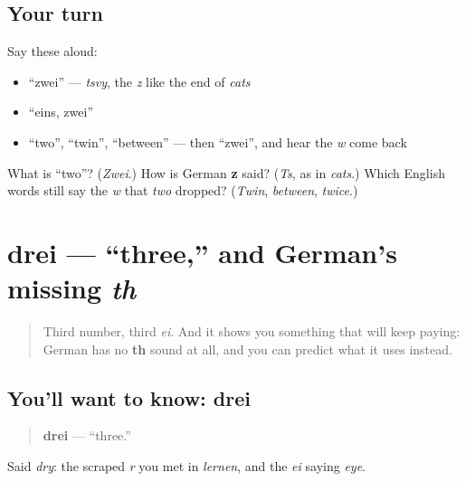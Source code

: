 \subsection*{Your turn}
Say these aloud:

\begin{itemize}
\raggedright
  \item \textquotedblleft{}zwei\textquotedblright{} — \emph{tsvy}, the \emph{z} like the end of \emph{cats}
  \item \textquotedblleft{}eins, zwei\textquotedblright{}
  \item \textquotedblleft{}two\textquotedblright{}, \textquotedblleft{}twin\textquotedblright{}, \textquotedblleft{}between\textquotedblright{} — then \textquotedblleft{}zwei\textquotedblright{}, and hear the \emph{w} come back
\end{itemize}

\begin{tcolorbox}[breakable,colback=teal!4,colframe=teal!35!black,title={Before you move on}]
What is \textquotedblleft{}two\textquotedblright{}? (\emph{Zwei}.) How is German \textbf{z} said? (\emph{Ts}, as in \emph{cats}.) Which English words still say the \emph{w} that \emph{two} dropped? (\emph{Twin}, \emph{between}, \emph{twice}.)
\end{tcolorbox}
\section[drei]{drei — \textquotedblleft{}three,\textquotedblright{} and German's missing \emph{th}}

\label{lesson:GE-C06-drei}



\begin{quote}
Third number, third \emph{ei}. And it shows you something that will keep paying: German has no \textbf{th} sound at all, and you can predict what it uses instead.
\end{quote}

\subsection*{You'll want to know: drei}
\begin{quote}
\textbf{drei} — \textquotedblleft{}three.\textquotedblright{}
\end{quote}

Said \emph{dry}: the scraped \emph{r} you met in \emph{lernen}, and the \emph{ei} saying \emph{eye}.

